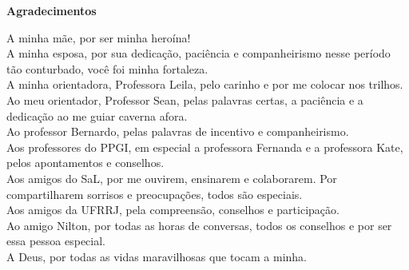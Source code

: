 \begin{flushright}
    \vspace*{72pt}
    \fontsize{16}{16}\selectfont \textbf{Agradecimentos}
    \vspace{60pt}
\end{flushright}

\noindent
\hspace*{1.5cm}A minha mãe, por ser minha heroína! \\
\hspace*{1.5cm}A minha esposa, por sua dedicação, paciência e companheirismo nesse período tão conturbado, você foi minha fortaleza. \\
\hspace*{1.5cm}A minha orientadora, Professora Leila, pelo carinho e por me colocar nos trilhos. \\
\hspace*{1.5cm}Ao meu orientador, Professor Sean, pelas palavras certas, a paciência e a dedicação ao me guiar caverna afora. \\
\hspace*{1.5cm}Ao professor Bernardo, pelas palavras de incentivo e companheirismo. \\
\hspace*{1.5cm}Aos professores do PPGI, em especial a professora Fernanda e a professora Kate, pelos apontamentos e conselhos. \\
\hspace*{1.5cm}Aos amigos do SaL, por me ouvirem, ensinarem e colaborarem. Por compartilharem sorrisos e preocupações, todos são especiais. \\
\hspace*{1.5cm}Aos amigos da UFRRJ, pela compreensão, conselhos e participação. \\
\hspace*{1.5cm}Ao amigo Nilton, por todas as horas de conversas, todos os conselhos e por ser essa pessoa especial. \\
\hspace*{1.5cm}A Deus, por todas as vidas maravilhosas que tocam a minha.
